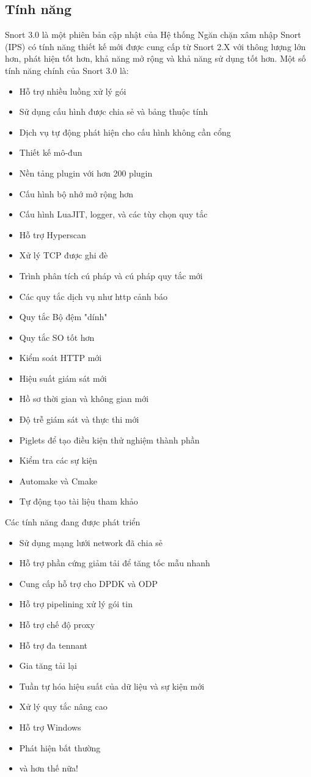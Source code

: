 \subsection{Tính năng}
Snort 3.0 là một phiên bản cập nhật của Hệ thống Ngăn chặn xâm nhập Snort (IPS) có tính năng thiết kế mới được cung cấp từ Snort 2.X với thông lượng lớn hơn, phát hiện tốt hơn, khả năng mở rộng và khả năng sử dụng tốt hơn. 
Một số tính năng chính của Snort 3.0 là:
\begin{itemize}
    \item Hỗ trợ nhiều luồng xử lý gói
    \item Sử dụng cấu hình được chia sẻ và bảng thuộc tính 
    \item Dịch vụ tự động phát hiện cho cấu hình không cần cổng
    \item Thiết kế mô-đun
    \item Nền tảng plugin với hơn 200 plugin
    \item Cấu hình bộ nhớ mở rộng hơn
    \item Cấu hình LuaJIT, logger, và các tùy chọn quy tắc
    \item Hỗ trợ Hyperscan
    \item Xử lý TCP được ghi đè
    \item Trình phân tích cú pháp và cú pháp quy tắc mới
    \item Các quy tắc dịch vụ như http cảnh báo
    \item Quy tắc  Bộ đệm "dính" 
    \item Quy tắc SO tốt hơn
    \item Kiểm soát HTTP mới
    \item Hiệu suất giám sát mới
    \item Hồ sơ thời gian và không gian mới
    \item Độ trễ giám sát và thực thi mới
    \item Piglets để tạo điều kiện thử nghiệm thành phần
    \item Kiểm tra các sự kiện
    \item Automake và Cmake
    \item Tự động tạo tài liệu tham khảo 
\end{itemize}
Các tính năng đang được phát triển
\begin{itemize}
    \item Sử dụng mạng lưới network đã chia sẻ
    \item Hỗ trợ phần cứng giảm tải để tăng tốc mẫu nhanh
    \item Cung cấp hỗ trợ cho DPDK và ODP
    \item Hỗ trợ pipelining xử lý gói tin
    \item Hỗ trợ chế độ proxy
    \item Hỗ trợ đa tennant
    \item Gia tăng tải lại
    \item Tuần tự hóa hiệu suất của dữ liệu và sự kiện mới
    \item Xử lý quy tắc nâng cao
    \item Hỗ trợ Windows
    \item Phát hiện bất thường
    \item và hơn thế nữa!
\end{itemize}

